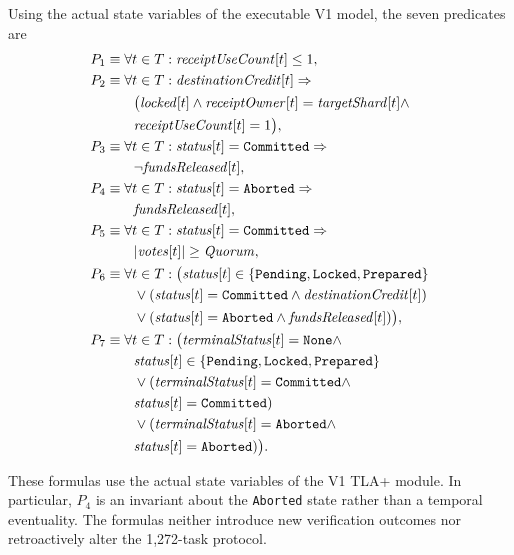 Using the actual state variables of the executable V1 model, the seven predicates are
\begin{align}
P_1 &\equiv \forall t\in T:\mathit{receiptUseCount}[t]\leq1,\notag\\
P_2 &\equiv \forall t\in T:
  \mathit{destinationCredit}[t]\Rightarrow\notag\\
  &\qquad\bigl(\mathit{locked}[t]\land
  \mathit{receiptOwner}[t]=\mathit{targetShard}[t]\land\notag\\
  &\qquad\mathit{receiptUseCount}[t]=1\bigr),\notag\\
P_3 &\equiv \forall t\in T:
  \mathit{status}[t]=\texttt{Committed}\Rightarrow\notag\\
  &\qquad\neg\mathit{fundsReleased}[t],\notag\\
P_4 &\equiv \forall t\in T:
  \mathit{status}[t]=\texttt{Aborted}\Rightarrow\notag\\
  &\qquad\mathit{fundsReleased}[t],\notag\\
P_5 &\equiv \forall t\in T:
  \mathit{status}[t]=\texttt{Committed}\Rightarrow\notag\\
  &\qquad\lvert\mathit{votes}[t]\rvert\geq\mathit{Quorum},\notag\\
P_6 &\equiv \forall t\in T:\bigl(
  \mathit{status}[t]\in\{\texttt{Pending},\texttt{Locked},\texttt{Prepared}\}\notag\\
  &\qquad\lor (\mathit{status}[t]=\texttt{Committed}\land
     \mathit{destinationCredit}[t])\notag\\
  &\qquad\lor (\mathit{status}[t]=\texttt{Aborted}\land
     \mathit{fundsReleased}[t])\bigr),\notag\\
P_7 &\equiv \forall t\in T:\bigl(
     \mathit{terminalStatus}[t]=\texttt{None}\land\notag\\
  &\qquad\mathit{status}[t]\in
     \{\texttt{Pending},\texttt{Locked},\texttt{Prepared}\}\notag\\
  &\qquad\lor(\mathit{terminalStatus}[t]=\texttt{Committed}\land\notag\\
  &\qquad\mathit{status}[t]=\texttt{Committed})\notag\\
  &\qquad\lor(\mathit{terminalStatus}[t]=\texttt{Aborted}\land\notag\\
  &\qquad\mathit{status}[t]=\texttt{Aborted})\bigr).
\label{eq:editorial-v1-invariants}
\end{align}

These formulas use the actual state variables of the V1 TLA+ module. In
particular, $P_4$ is an invariant about the \texttt{Aborted} state rather
than a temporal eventuality. The formulas neither introduce new
verification outcomes nor retroactively alter the 1,272-task protocol.

